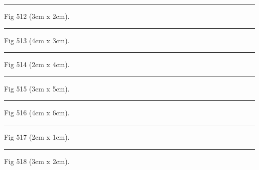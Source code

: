\documentclass[a4paper,11pt]{article}
\begin{document}
\begin{swarmwrap}%
  \begin{minipage}[t]{3cm}
    \centering
    \rule{\linewidth}{2cm}
    {\footnotesize Fig 512 (3cm x 2cm).}
  \end{minipage}%
\end{swarmwrap}%
\swarmwrapnext
\lipsum[62]%

\begin{swarmwrap}%
  \begin{minipage}[t]{4cm}
    \centering
    \rule{\linewidth}{3cm}
    {\footnotesize Fig 513 (4cm x 3cm).}
  \end{minipage}%
\end{swarmwrap}%
\swarmwrapnext
\lipsum[63]%

\begin{swarmwrap}%
  \begin{minipage}[t]{2cm}
    \centering
    \rule{\linewidth}{4cm}
    {\footnotesize Fig 514 (2cm x 4cm).}
  \end{minipage}%
\end{swarmwrap}%
\swarmwrapnext
\lipsum[64]%

\begin{swarmwrap}%
  \begin{minipage}[t]{3cm}
    \centering
    \rule{\linewidth}{5cm}
    {\footnotesize Fig 515 (3cm x 5cm).}
  \end{minipage}%
\end{swarmwrap}%
\swarmwrapnext
\lipsum[65]%

\begin{swarmwrap}%
  \begin{minipage}[t]{4cm}
    \centering
    \rule{\linewidth}{6cm}
    {\footnotesize Fig 516 (4cm x 6cm).}
  \end{minipage}%
\end{swarmwrap}%
\swarmwrapnext
\lipsum[66]%

\begin{swarmwrap}%
  \begin{minipage}[t]{2cm}
    \centering
    \rule{\linewidth}{1cm}
    {\footnotesize Fig 517 (2cm x 1cm).}
  \end{minipage}%
\end{swarmwrap}%
\swarmwrapnext
\lipsum[67]%

\begin{swarmwrap}%
  \begin{minipage}[t]{3cm}
    \centering
    \rule{\linewidth}{2cm}
    {\footnotesize Fig 518 (3cm x 2cm).}
  \end{minipage}%
\end{swarmwrap}%
\swarmwrapnext
\lipsum[68]%
\end{document}
